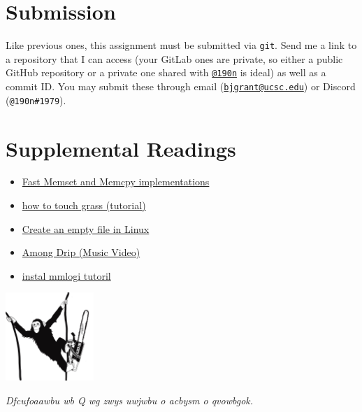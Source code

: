 \documentclass[11pt]{article}
\begin{document}
\section{Submission}

\noindent
Like previous ones, this assignment must be submitted via \texttt{git}. Send me a link to a repository that I can access (your GitLab ones are private, so either a public GitHub repository or a private one shared with \href{https://github.com/190n}{\texttt{@190n}} is ideal) as well as a commit ID. You may submit these through email (\href{mailto:bjgrant@ucsc.edu?subject=Assignment\%208\%20submission}{\texttt{bjgrant@ucsc.edu}}) or Discord (\texttt{@190n\#1979}).

\section{Supplemental Readings}

\begin{itemize}
    \item \href{https://github.com/nadavrot/memset_benchmark}{Fast Memset and Memcpy implementations}
    \item \href{https://www.youtube.com/watch?v=Tix4hb2K3mY}{how to touch grass (tutorial)}
    \item \href{https://techwritersblog.com/linux/create_an_empty_file_in_linux/}{Create an empty file in Linux}
    \item \href{https://www.youtube.com/watch?v=xyOc32abDQ8}{Among Drip (Music Video)}
    \item \href{https://www.youtube.com/watch?v=cVF4rat_wFY}{instal mmlogi tutoril}
\end{itemize}

\begin{center}
\includegraphics[width=0.25\textwidth]{monke}

\emph{Dfcufoaawbu wb Q wg zwys uwjwbu o acbysm o qvowbgok.}
\end{center}
\end{document}
